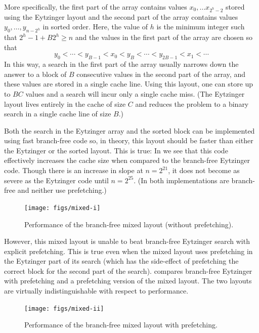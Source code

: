 \documentclass{patmorin}
\begin{document}
More specifically, the first part of the array contains values $x_0,\ldots
x_{2^{h}-2}$ stored using the Eytzinger layout and the second part of
the array contains values $y_0,\ldots,y_{n-2^h}$ in sorted order.  Here,
the value of $h$ is the minimum integer such that $2^{h}-1 + B2^h \ge n$
and the values in the first part of the array are chosen so that
\[
    y_0<\cdots<y_{B-1} < x_0 < y_{B}<\cdots<y_{2B-1} < x_1 < \cdots
\]
In this way, a search in the first part of the array usually narrows
down the answer to a block of $B$ consecutive values in the second part
of the array, and these values are stored in a single cache line. Using
this layout, one can store up to $BC$ values and a search will incur
only a single cache miss. (The Eytzinger layout lives entirely in the
cache of size $C$ and reduces the problem to a binary search in a single
cache line of size $B$.)

Both the search in the Eytzinger array and the sorted block can be
implemented using fast branch-free code so, in theory, this layout
should be faster than either the Eytzinger or the sorted layout.
This is true: In  we see that this code effectively
increases the cache size when compared to the branch-free Eytzinger code.
Though there is an increase in slope at $n=2^{21}$, it does not become
as severe as the Eytzinger code until $n=2^{25}$.  (In 
both implementations are branch-free and neither use prefetching.)

\begin{figure}
   \begin{center}
     \texttt{[image: figs/mixed-i]}
   \end{center}
   \caption{Performance of the branch-free mixed layout (without prefetching).}
\end{figure}

However, this mixed layout is unable to beat branch-free Eytzinger
search with explicit prefetching. This is true even when the mixed
layout uses prefetching in the Eytzinger part of its search (which has
the side-effect of prefetching the correct block for the second part
of the search).  compares branch-free Eytzinger with
prefetching and a prefetching version of the mixed layout.  The two
layouts are virtually indistinguishable with respect to performance.

\begin{figure}
   \begin{center}
     \texttt{[image: figs/mixed-ii]}
   \end{center}
   \caption{Performance of the branch-free mixed layout with prefetching.}
\end{figure}
\end{document}
